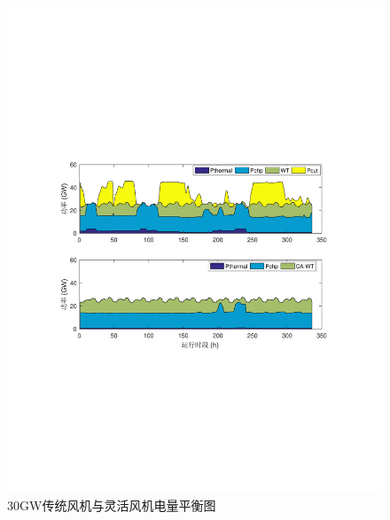 \begin{figure}[H] %
  \centering
  \includegraphics[scale=0.85]{figures/Chap5-Power-Balance-30G-WT.pdf}
  \caption{30GW传统风机与灵活风机电量平衡图}
  \label{fig:Power-Balance-30G-WT}
\end{figure}


